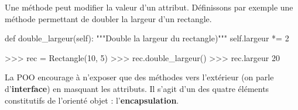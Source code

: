 \documentclass[
  letterpaper,
  DIV=11,
  numbers=noendperiod]{scrartcl}
\newenvironment{Shaded}{\begin{snugshade}}{\end{snugshade}}
\newcommand{\CommentTok}[1]{\textcolor[rgb]{0.37,0.37,0.37}{#1}}
\newcommand{\DecValTok}[1]{\textcolor[rgb]{0.68,0.00,0.00}{#1}}
\newcommand{\KeywordTok}[1]{\textcolor[rgb]{0.00,0.23,0.31}{#1}}
\newcommand{\NormalTok}[1]{\textcolor[rgb]{0.00,0.23,0.31}{#1}}
\newcommand{\OperatorTok}[1]{\textcolor[rgb]{0.37,0.37,0.37}{#1}}
\newcommand{\VariableTok}[1]{\textcolor[rgb]{0.07,0.07,0.07}{#1}}
\begin{document}
Une méthode peut modifier la valeur d'un attribut. Définissons par
exemple une méthode permettant de doubler la largeur d'un rectangle.

\begin{Shaded}
\begin{Highlighting}[]
\KeywordTok{def}\NormalTok{ double\_largeur(}\VariableTok{self}\NormalTok{):}
    \CommentTok{"""Double la largeur du rectangle)"""}
    \VariableTok{self}\NormalTok{.largeur }\OperatorTok{*=} \DecValTok{2}
\end{Highlighting}
\end{Shaded}

\begin{Shaded}
\begin{Highlighting}[]
\OperatorTok{\textgreater{}\textgreater{}\textgreater{}}\NormalTok{ rec }\OperatorTok{=}\NormalTok{ Rectangle(}\DecValTok{10}\NormalTok{, }\DecValTok{5}\NormalTok{)}
\OperatorTok{\textgreater{}\textgreater{}\textgreater{}}\NormalTok{ rec.double\_largeur()}
\OperatorTok{\textgreater{}\textgreater{}\textgreater{}}\NormalTok{ rec.largeur}
\DecValTok{20}
\end{Highlighting}
\end{Shaded}

La POO encourage à n'exposer que des méthodes vers l'extérieur (on parle
d'\textbf{interface}) en masquant les attributs. Il s'agit d'un des
quatre éléments constitutifs de l'orienté objet :
l'\textbf{encapsulation}.
\end{document}
